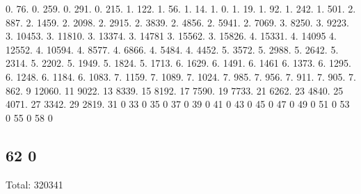 0. 76. 0. 259. 0. 291. 0. 215. 1. 122. 1. 56. 1. 14. 1. 0. 1. 19. 1. 92. 1. 242. 1. 501. 2. 887. 2. 1459. 2. 2098. 2. 2915. 2. 3839. 2. 4856. 2. 5941. 2. 7069. 3. 8250. 3. 9223. 3. 10453. 3. 11810. 3. 13374. 3. 14781 3. 15562. 3. 15826. 4. 15331. 4. 14095 4. 12552. 4. 10594. 4. 8577. 4. 6866. 4. 5484. 4. 4452. 5. 3572. 5. 2988. 5. 2642. 5. 2314. 5. 2202. 5. 1949. 5. 1824. 5. 1713. 6. 1629. 6. 1491. 6. 1461 6. 1373. 6. 1295. 6. 1248. 6. 1184. 6. 1083. 7. 1159. 7. 1089. 7. 1024. 7. 985. 7. 956. 7. 911. 7. 905. 7. 862. 9 12060. 11 9022. 13 8339. 15 8192. 17 7590. 19 7733. 21 6262. 23 4840. 25 4071. 27 3342. 29 2819. 31 0 33 0 35 0 37 0 39 0 41 0 43 0 45 0 47 0 49 0 51 0 53 0 55 0 58 0 \subsection*{62 0 }

Total\+: 320341 